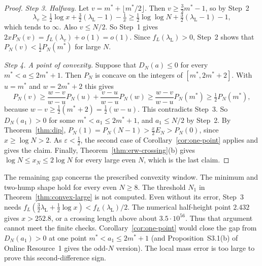 \begin{proof}
\emph{Step 3. Halfway.} Let $v=m^*+\lfloor m^*/2\rfloor$. Then
$v\ge\frac32m^*-1$, so by Step~2
\[
 \lambda_v\ge\tfrac12\log x+\tfrac32(\lambda_{\mathrm L}-1)-\tfrac1x
 \ge\tfrac12\log\log N+\tfrac32(\lambda_{\mathrm L}-1)-1 ,
\]
which tends to $\infty$.
Also $v\le N/2$. So Step~1 gives $2xP_N(v)=f_L(\lambda_v)+o(1)=o(1)$. Since
$f_L(\lambda_{\mathrm L})>0$, Step~2 shows that $P_N(v)<\frac12P_N(m^*)$ for large $N$.

\emph{Step 4. A point of convexity.} Suppose that $D_N(a)\le0$ for every
$m^*<a\le2m^*+1$. Then $P_N$ is concave on the integers of $[m^*,2m^*+2]$.
With $u=m^*$ and $w=2m^*+2$ this gives
\[
 P_N(v)\ge\frac{w-v}{w-u}P_N(u)+\frac{v-u}{w-u}P_N(w)\ge\frac{w-v}{w-u}P_N(m^*)
 \ge\tfrac12P_N(m^*),
\]
because $w-v\ge\frac12(m^*+2)=\frac12(w-u)$. This contradicts Step~3. So
$D_N(a_1)>0$ for some $m^*<a_1\le2m^*+1$, and $a_1\le N/2$ by Step~2.
By Theorem~\ref{thm:dip}, $P_N(1)=P_N(N-1)>\frac x2E_N>P_N(0)$, since $x\ge\log N>2$. As
$\varepsilon<\frac12$, the second case of Corollary~\ref{cor:one-point} applies and gives the
claim. Finally, Theorem~\ref{thm:erw-crossing}(b) gives $\log N\le x_N\le2\log N$ for every
large even $N$, which is the last claim.
\end{proof}

\begin{remark}\label{rem:convex-open}
The remaining gap concerns the prescribed convexity window. The minimum
and two-hump shape hold for every even $N\ge8$.
The threshold $N_1$ in Theorem~\ref{thm:convex-large} is not computed.
Even without its error, Step~3 needs
$f_L(\frac32\lambda_{\mathrm L}+\frac12\log x)<f_L(\lambda_{\mathrm L})/2$.
The numerical half-height point $2.432$ gives $x>252.8$, or a crossing
length above about $3.5\cdot10^{56}$. Thus that argument cannot meet the
finite checks. Corollary~\ref{cor:one-point} would close the gap from
$D_N(a_1)>0$ at one point $m^*<a_1\le2m^*+1$ (and
Proposition~S3.1(b) of Online Resource~1 gives the odd-$N$ version).
The local mass error is too large to prove this second-difference sign.
\end{remark}
